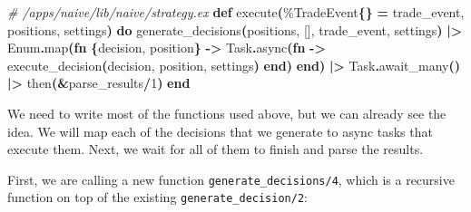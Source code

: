 \documentclass[
  oneside]{book}
\newenvironment{Shaded}{\begin{snugshade}}{\end{snugshade}}
\newcommand{\CommentTok}[1]{\textcolor[rgb]{0.56,0.35,0.01}{\textit{#1}}}
\newcommand{\ConstantTok}[1]{\textcolor[rgb]{0.56,0.35,0.01}{#1}}
\newcommand{\DecValTok}[1]{\textcolor[rgb]{0.00,0.00,0.81}{#1}}
\newcommand{\FunctionTok}[1]{\textcolor[rgb]{0.13,0.29,0.53}{\textbf{#1}}}
\newcommand{\KeywordTok}[1]{\textcolor[rgb]{0.13,0.29,0.53}{\textbf{#1}}}
\newcommand{\NormalTok}[1]{#1}
\newcommand{\OperatorTok}[1]{\textcolor[rgb]{0.81,0.36,0.00}{\textbf{#1}}}
\newcommand{\OtherTok}[1]{\textcolor[rgb]{0.56,0.35,0.01}{#1}}
\begin{document}
\begin{Shaded}
\begin{Highlighting}[]
   \CommentTok{\# /apps/naive/lib/naive/strategy.ex}
  \KeywordTok{def}\NormalTok{ execute}\FunctionTok{(}\NormalTok{\%}\ConstantTok{TradeEvent}\FunctionTok{\{\}} \OperatorTok{=}\NormalTok{ trade\_event, positions, settings}\FunctionTok{)} \KeywordTok{do}
\NormalTok{    generate\_decisions}\FunctionTok{(}\NormalTok{positions, }\OtherTok{[]}\NormalTok{, trade\_event, settings}\FunctionTok{)}
    \OperatorTok{|\textgreater{}} \ConstantTok{Enum}\OperatorTok{.}\NormalTok{map}\FunctionTok{(}\KeywordTok{fn} \FunctionTok{\{}\NormalTok{decision, position}\FunctionTok{\}} \OperatorTok{{-}\textgreater{}}
      \ConstantTok{Task}\OperatorTok{.}\NormalTok{async}\FunctionTok{(}\KeywordTok{fn} \OperatorTok{{-}\textgreater{}}\NormalTok{ execute\_decision}\FunctionTok{(}\NormalTok{decision, position, settings}\FunctionTok{)} \KeywordTok{end}\FunctionTok{)}
    \KeywordTok{end}\FunctionTok{)}
    \OperatorTok{|\textgreater{}} \ConstantTok{Task}\OperatorTok{.}\NormalTok{await\_many}\FunctionTok{()}
    \OperatorTok{|\textgreater{}}\NormalTok{ then}\FunctionTok{(}\OperatorTok{\&}\NormalTok{parse\_results}\OperatorTok{/}\DecValTok{1}\FunctionTok{)}
  \KeywordTok{end}
\end{Highlighting}
\end{Shaded}

\newpage

We need to write most of the functions used above, but we can already see the idea. We will map each of the decisions that we generate to async tasks that execute them. Next, we wait for all of them to finish and parse the results.

First, we are calling a new function \texttt{generate\_decisions/4}, which is a recursive function on top of the existing \texttt{generate\_decision/2}:
\end{document}
